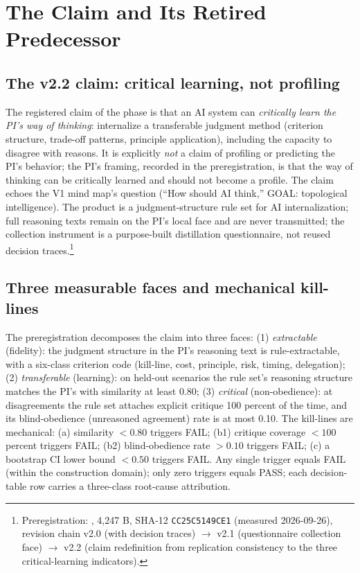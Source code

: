 \documentclass[11pt]{article}
\newcommand{\sha}[1]{\texttt{#1}}
\begin{document}
\section{The Claim and Its Retired Predecessor}\label{sec:claim}

\subsection{The v2.2 claim: critical learning, not profiling}

The registered claim of the phase is that an AI system can \emph{critically learn the PI's way of thinking}: internalize a transferable judgment method (criterion structure, trade-off patterns, principle application), including the capacity to disagree with reasons. It is explicitly \emph{not} a claim of profiling or predicting the PI's behavior; the PI's framing, recorded in the preregistration, is that the way of thinking can be critically learned and should not become a profile. The claim echoes the V1 mind map's question (``How should AI think,'' GOAL: topological intelligence). The product is a judgment-structure rule set for AI internalization; full reasoning texts remain on the PI's local face and are never transmitted; the collection instrument is a purpose-built distillation questionnaire, not reused decision traces.\footnote{Preregistration: , 4{,}247 B, SHA-12 \sha{CC25C5149CE1} (measured 2026-09-26), revision chain v2.0 (with decision traces) $\rightarrow$ v2.1 (questionnaire collection face) $\rightarrow$ v2.2 (claim redefinition from replication consistency to the three critical-learning indicators).}

\subsection{Three measurable faces and mechanical kill-lines}

The preregistration decomposes the claim into three faces: (1) \emph{extractable} (fidelity): the judgment structure in the PI's reasoning text is rule-extractable, with a six-class criterion code (kill-line, cost, principle, risk, timing, delegation); (2) \emph{transferable} (learning): on held-out scenarios the rule set's reasoning structure matches the PI's with similarity at least 0.80; (3) \emph{critical} (non-obedience): at disagreements the rule set attaches explicit critique 100 percent of the time, and its blind-obedience (unreasoned agreement) rate is at most 0.10. The kill-lines are mechanical: (a) similarity $< 0.80$ triggers FAIL; (b1) critique coverage $< 100$ percent triggers FAIL; (b2) blind-obedience rate $> 0.10$ triggers FAIL; (c) a bootstrap CI lower bound $< 0.50$ triggers FAIL. Any single trigger equals FAIL (within the construction domain); only zero triggers equals PASS; each decision-table row carries a three-class root-cause attribution.
\end{document}
